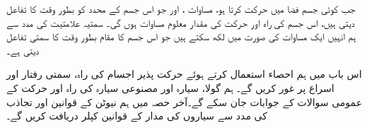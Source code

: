 
\quad
جب کوئی جسم فضا میں حرکت کرتا ہو،   مساوات   ،  اور   جو اس جسم کے محدد  کو بطور وقت کا تفاعل  دیتی ہیں،  اس جسم کی راہ اور حرکت کی مقدار معلوم مساوات ہوں گی۔ سمتیہ   علامتیت  کی مدد سے ہم انہیں ایک مساوات  کی صورت میں لکھ سکتے ہیں جو اس جسم کا مقام بطور وقت کا سمتی تفاعل دیتی ہے۔

اس باب میں  ہم احصاء استعمال کرتے ہوئے حرکت پذیر اجسام کی راہ، سمتی رفتار اور اسراع پر غور کریں گے۔ ہم  گولا،  سیارہ  اور مصنوعی سیارہ کی راہ اور حرکت کے عمومی سوالات کے جوابات جان سکے گے۔آخر حصہ میں ہم نیوٹن کے قوانین اور    تجاذب کی مدد سے سیاروں کی مدار کے  قوانین کپلر دریافت کریں گے۔ 


